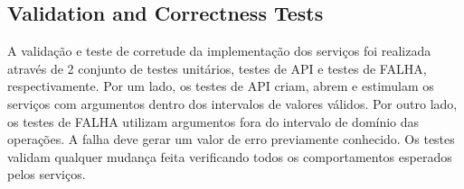 		\subsection{Validation and Correctness Tests}

			A validação e teste de corretude da implementação dos serviços foi realizada através de 2 conjunto de testes unitários, testes de API e testes de FALHA, respectivamente.
			Por um lado, os testes de API criam, abrem e estimulam os serviços com argumentos dentro dos intervalos de valores válidos.
			Por outro lado, os testes de FALHA utilizam argumentos fora do intervalo de domínio das operações.
			A falha deve gerar um valor de erro previamente conhecido.
			Os testes validam qualquer mudança feita verificando todos os comportamentos esperados pelos serviços.
